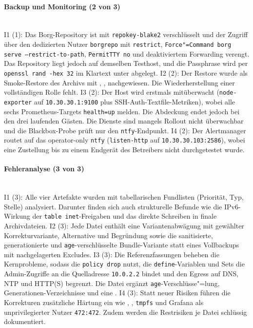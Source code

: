 \paragraph{Backup und Monitoring (2 von 3)} \mbox{}\\
I1 (1): Das Borg-Repository ist mit \texttt{repokey-blake2} verschlüsselt und der Zugriff über den dedizierten Nutzer \texttt{borgrepo} mit \texttt{restrict}, \texttt{Force"=Command borg serve --restrict-to-path}, \texttt{PermitTTY no} und deaktiviertem Forwarding verengt.
Das Repository liegt jedoch auf demselben Testhost, und die Passphrase wird per \texttt{openssl rand -hex 32} im Klartext unter  abgelegt.\cite{section5scriptB,finalsummaryB}
I2 (2): Der Restore wurde als Smoke-Restore des Archivs  mit , ,  nachgewiesen.
Die Wiederherstellung einer vollständigen Rolle fehlt.\cite{finalsummaryB,validatornotesB}
I3 (2): Der Host wird erstmals mitüberwacht (\texttt{node-exporter} auf \texttt{10.30.30.1:9100} plus \ac{SSH}-Auth-Textfile-Metriken), wobei alle sechs Prometheus-Targets \texttt{health=up} melden. 
Die Abdeckung endet jedoch bei den drei laufenden Gästen. Die Dienste sind mangels Rollout nicht überwachbar und die Blackbox-Probe prüft nur den \texttt{ntfy}-Endpunkt.\cite{section5scriptB,finalsummaryB,implementationlogB}
I4 (2): Der Alertmanager routet auf das operator-only \texttt{ntfy} (\texttt{listen-http} auf \texttt{10.30.30.103:2586}), wobei eine Zustellung bis zu einem Endgerät des Betreibers nicht durchgetestet wurde.\cite{section5scriptB,finalsummaryB}

\paragraph{Fehleranalyse (3 von 3)} \mbox{}\\
I1 (3): Alle vier Artefakte wurden mit tabellarischen Fundlisten (Priorität, Typ, Stelle) analysiert. Darunter finden sich auch strukturelle Befunde wie die \ac{IP}v6-Wirkung der \texttt{table inet}-Freigaben und das direkte Schreiben in finale Archivdateien.\cite{artefaktreviewB}
I2 (3): Jede Datei enthält eine Variantenabwägung mit gewählter Korrekturvariante, Alternative und Begründung sowie die sanitisierte, generationierte und \texttt{age}-verschlüsselte Bundle-Variante statt eines Vollbackups mit nachgelagerten Excludes.\cite{artefaktreviewB}
I3 (3): Die Referenzfassungen beheben die Kernprobleme, sodass die  \texttt{policy drop} nutzt, die \texttt{define}-Variablen und Sets die Admin-Zugriffe an die Quelladresse \texttt{10.0.2.2} bindet und den Egress auf \ac{DNS}, \ac{NTP} und \ac{HTTP}(S) begrenzt.
Die Datei  ergänzt \texttt{age}-Verschlüsse"=lung, Generationen-Verzeichnisse und eine .\cite{artefaktreviewB}
I4 (3): Statt neuer Risiken führen die Korrekturen zusätzliche Härtung ein wie , , \texttt{tmpfs} und Grafana als unprivilegierter Nutzer \texttt{472:472}. Zudem werden die Restrisiken je Datei schlüssig dokumentiert.\cite{artefaktreviewB}

